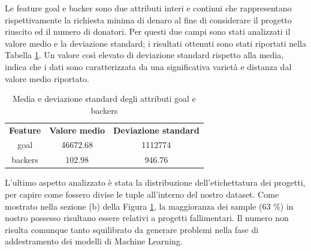 Le feature goal e backer sono due attributi interi e continui che rappresentano rispettivamente la richiesta minima di denaro al fine di considerare il progetto riuscito ed il numero di donatori. Per questi due campi sono stati analizzati il valore medio e la deviazione standard; i risultati ottenuti sono stati riportati nella Tabella \ref{tab:backer}. Un valore così elevato di deviazione standard rispetto alla media, indica che i dati sono caratterizzata da una significativa varietà e distanza dal valore medio riportato.

\begin{table}
	\centering
	\caption{Media e deviazione standard degli attributi goal e backers}
	\begin{tabular}{|c|cc|}
		\hline 
		\textbf{Feature} & \textbf{Valore medio} & \textbf{Deviazione standard} \\  
		goal & 46672.68 & 1112774 \\ 
		backers & 102.98 & 946.76 \\ 
	\end{tabular} 
	\label{tab:backer}
\end{table}


L'ultimo aspetto analizzato è stata la distribuzione dell'etichettatura dei progetti, per capire come fossero divise le tuple all'interno del nostro dataset. Come mostrato nella sezione (b) della Figura \ref{fig:piestate}, la maggioranza dei sample (63 \%) in nostro possesso risultano essere relativi a progetti fallimentari. Il numero non risulta comunque tanto squilibrato da generare problemi nella fase di addestramento dei modelli di Machine Learning.

\begin{figure}%
	\centering
	\qquad
	\caption{}%
	\label{fig:piestate}%
\end{figure}

